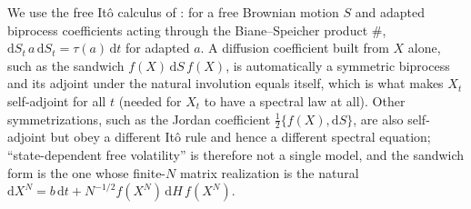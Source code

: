 \documentclass[11pt]{article}
\newcommand{\dd}{\mathrm{d}}
\theoremstyle{plain}
\theoremstyle{definition}
\theoremstyle{remark}
\begin{document}
We use the free It\^o calculus of \citet{BianeSpeicher1998}: for a free Brownian
motion $S$ and adapted biprocess coefficients acting through the Biane--Speicher
product $\#$, $\dd S_t\,a\,\dd S_t = \tau(a)\,\dd t$ for adapted $a$. A diffusion
coefficient built from $X$ alone, such as the sandwich $f(X)\,\dd S\,f(X)$, is
automatically a symmetric biprocess and its adjoint under the natural involution
equals itself, which is what makes $X_t$ self-adjoint for all $t$ (needed for
$X_t$ to have a spectral law at all). Other symmetrizations, such as the Jordan
coefficient $\tfrac12\{f(X),\dd S\}$, are also self-adjoint but obey a different
It\^o rule and hence a different spectral equation; ``state-dependent free volatility''
is therefore not a single model, and the sandwich form is the one whose finite-$N$
matrix realization is the natural $\dd X^N = b\,\dd t + N^{-1/2}f(X^N)\,\dd H\,
f(X^N)$.
\end{document}

